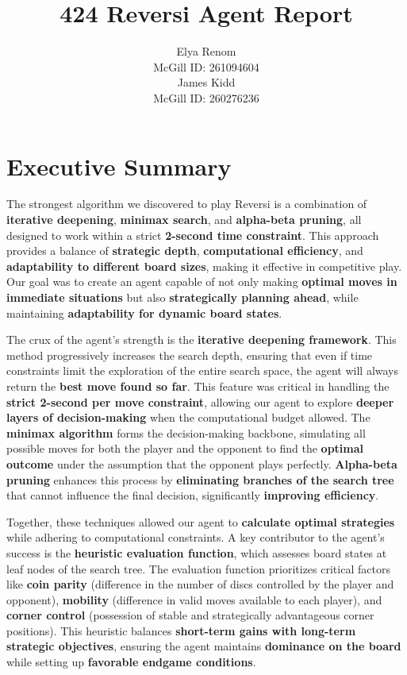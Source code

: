 \documentclass[11pt]{article}
\title{424 Reversi Agent Report}
\author{
    Elya Renom \\ 
    McGill ID: 261094604 \\[1em]
    James Kidd \\ 
    McGill ID: 260276236
}
\date{}
\begin{document}
\maketitle

\section*{Executive Summary}
The strongest algorithm we discovered to play Reversi is a combination of \textbf{iterative deepening}, \textbf{minimax search}, and \textbf{alpha-beta pruning}, all designed to work within a strict \textbf{2-second time constraint}. This approach provides a balance of \textbf{strategic depth}, \textbf{computational efficiency}, and \textbf{adaptability to different board sizes}, making it effective in competitive play. Our goal was to create an agent capable of not only making \textbf{optimal moves in immediate situations} but also \textbf{strategically planning ahead}, while maintaining \textbf{adaptability for dynamic board states}.

The crux of the agent's strength is the \textbf{iterative deepening framework}. This method progressively increases the search depth, ensuring that even if time constraints limit the exploration of the entire search space, the agent will always return the \textbf{best move found so far}. This feature was critical in handling the \textbf{strict 2-second per move constraint}, allowing our agent to explore \textbf{deeper layers of decision-making} when the computational budget allowed. The \textbf{minimax algorithm} forms the decision-making backbone, simulating all possible moves for both the player and the opponent to find the \textbf{optimal outcome} under the assumption that the opponent plays perfectly. \textbf{Alpha-beta pruning} enhances this process by \textbf{eliminating branches of the search tree} that cannot influence the final decision, significantly \textbf{improving efficiency}. 

Together, these techniques allowed our agent to \textbf{calculate optimal strategies} while adhering to computational constraints. A key contributor to the agent’s success is the \textbf{heuristic evaluation function}, which assesses board states at leaf nodes of the search tree. The evaluation function prioritizes critical factors like \textbf{coin parity} (difference in the number of discs controlled by the player and opponent), \textbf{mobility} (difference in valid moves available to each player), and \textbf{corner control} (possession of stable and strategically advantageous corner positions). This heuristic balances \textbf{short-term gains with long-term strategic objectives}, ensuring the agent maintains \textbf{dominance on the board} while setting up \textbf{favorable endgame conditions}.
\end{document}
